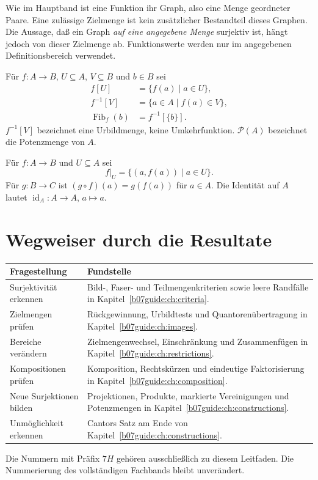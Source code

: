 Wie im Hauptband ist eine Funktion ihr Graph, also eine Menge
geordneter Paare. Eine zulässige Zielmenge ist kein zusätzlicher
Bestandteil dieses Graphen. Die Aussage, daß ein Graph
\emph{auf eine angegebene Menge} surjektiv ist, hängt jedoch von
dieser Zielmenge ab. Funktionswerte werden nur im angegebenen
Definitionsbereich verwendet.

\begin{definition}
Für $f\colon A\to B$, $U\subseteq A$, $V\subseteq B$ und $b\in B$ sei
\[
 \begin{aligned}
 f[U]&=\{f(a)\mid a\in U\},\\
 f^{-1}[V]&=\{a\in A\mid f(a)\in V\},\\
 \operatorname{Fib}_f(b)&=f^{-1}[\{b\}].
 \end{aligned}
\]
$f^{-1}[V]$ bezeichnet eine Urbildmenge, keine Umkehrfunktion.
$\mathcal P(A)$ bezeichnet die Potenzmenge von $A$.
\end{definition}

\begin{definition}
Für $f\colon A\to B$ und $U\subseteq A$ sei
\[
 f|_U=\{(a,f(a))\mid a\in U\}.
\]
Für $g\colon B\to C$ ist $(g\circ f)(a)=g(f(a))$ für $a\in A$.
Die Identität auf $A$ lautet
$\operatorname{id}_A\colon A\to A$, $a\mapsto a$.
\end{definition}

\section{Wegweiser durch die Resultate}

\begin{center}
\begin{tabularx}{\textwidth}{@{}p{}X@{}}
\toprule
Fragestellung & Fundstelle\\
\midrule
Surjektivität erkennen &
Bild-, Faser- und Teilmengenkriterien sowie leere Randfälle
in Kapitel~\ref{b07guide:ch:criteria}.\\
Zielmengen prüfen &
Rückgewinnung, Urbildtests und Quantorenübertragung
in Kapitel~\ref{b07guide:ch:images}.\\
Bereiche verändern &
Zielmengenwechsel, Einschränkung und Zusammenfügen
in Kapitel~\ref{b07guide:ch:restrictions}.\\
Kompositionen prüfen &
Komposition, Rechtskürzen und eindeutige Faktorisierung
in Kapitel~\ref{b07guide:ch:composition}.\\
Neue Surjektionen bilden &
Projektionen, Produkte, markierte Vereinigungen und
Potenzmengen in Kapitel~\ref{b07guide:ch:constructions}.\\
Unmöglichkeit erkennen &
Cantors Satz am Ende von Kapitel~\ref{b07guide:ch:constructions}.\\
\bottomrule
\end{tabularx}
\end{center}

Die Nummern mit Präfix $7H$ gehören ausschließlich zu diesem
Leitfaden. Die Nummerierung des vollständigen Fachbands bleibt
unverändert.